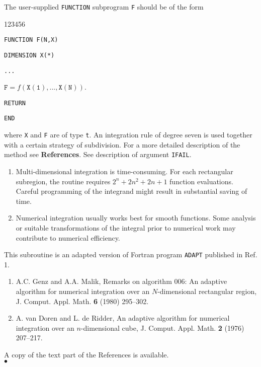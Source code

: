 \par
The user-supplied {\tt FUNCTION} subprogram {\tt F} should be of
the form
\begin{DLtt}{123456}
\item[] {\tt FUNCTION F(N,X)}
\item[] {\tt DIMENSION X(*)}
\item[] {\tt ...}
\item[] $\mathtt{F = }f(\mathtt{X(1),...,X(N)})$.
\item[] {\tt RETURN}
\item[] {\tt END}
\end{DLtt}
where {\tt X} and {\tt F} are of type {\tt t}.
\Method
An integration rule of degree seven is used together
with a certain strategy of subdivision.
For a more detailed description of the method see {\bf References}.
\Errorh
See description of argument {\tt IFAIL}.
\Notes
\begin{enumerate}
\item Multi-dimensional integration is time-consuming.
For each rectangular subregion, the routine requires $2^n+2n^2+2n+1$
function evaluations. Careful
programming of the integrand might result in substantial saving of time.
\item Numerical integration usually works best for smooth functions.
Some analysis or suitable transformations of the integral
prior to numerical work may contribute to numerical efficiency.
\end{enumerate}
\Source
This subroutine is an adapted version of Fortran program {\tt ADAPT}
published in Ref. 1.
\Refer
\begin{enumerate}
\item  A.C. Genz and A.A. Malik, Remarks on algorithm 006: An adaptive
algorithm for numerical integration over an $N$-dimensional rectangular
region, J. Comput. Appl. Math. {\bf 6} (1980) 295--302.
\item  A. van Doren and L. de Ridder, An adaptive
algorithm for numerical integration over an $n$-dimensional cube,
J. Comput. Appl. Math. {\bf 2} (1976) 207--217.
\end{enumerate}
A copy of the text part of the References is available.
\\ $\bullet$

